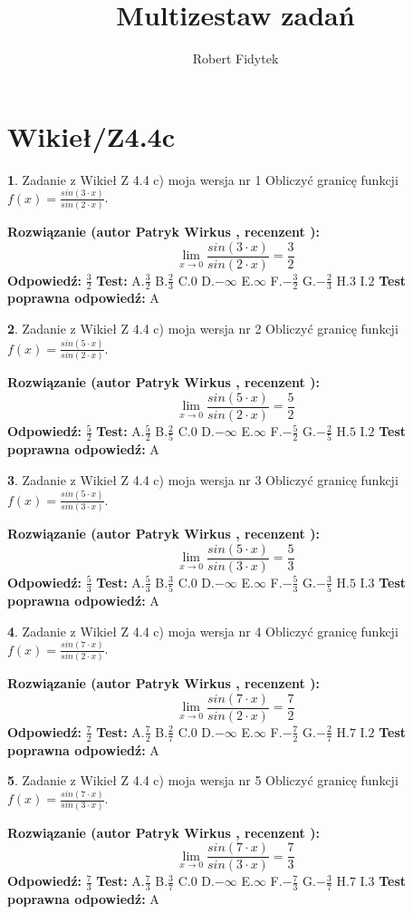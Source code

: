 \documentclass[12pt, a4paper]{article}
\title{Multizestaw zadań}
\author{Robert Fidytek}
\date{}
\theoremstyle{definition} %
\newtheorem{zad}{}
\newcommand{\kategoria}[1]{\section{#1}}
\newcommand{\zadStart}[1]{\begin{zad}#1\newline}
\newcommand{\zadStop}{\end{zad}}
\newcommand{\rozwStart}[2]{\noindent \textbf{Rozwiązanie (autor #1 , recenzent #2): }\newline}
\newcommand{\rozwStop}{\newline}
\newcommand{\odpStart}{\noindent \textbf{Odpowiedź:}\newline}
\newcommand{\odpStop}{\newline}
\newcommand{\testStart}{\noindent \textbf{Test:}\newline}
\newcommand{\testStop}{\newline}
\newcommand{\kluczStart}{\noindent \textbf{Test poprawna odpowiedź:}\newline}
\newcommand{\kluczStop}{\newline}
\begin{document}
\maketitle

\kategoria{Wikieł/Z4.4c}


\zadStart{Zadanie z Wikieł Z 4.4 c) moja wersja nr 1}
Obliczyć granicę funkcji $f(x)=\frac{sin(3\cdot x)}{sin(2\cdot x)}$.
\zadStop
\rozwStart{Patryk Wirkus}{}
$$\lim\limits_{x\to 0}\frac{sin(3\cdot x)}{sin(2\cdot x)}=
\frac{3}{2}$$
\rozwStop
\odpStart
$\frac{3}{2}$
\odpStop
\testStart
A.$\frac{3}{2}$
B.$\frac{2}{3}$
C.$0$
D.$-\infty$
E.$\infty$
F.$-\frac{3}{2}$
G.$-\frac{2}{3}$
H.$3$
I.$2$
\testStop
\kluczStart
A
\kluczStop



\zadStart{Zadanie z Wikieł Z 4.4 c) moja wersja nr 2}
Obliczyć granicę funkcji $f(x)=\frac{sin(5\cdot x)}{sin(2\cdot x)}$.
\zadStop
\rozwStart{Patryk Wirkus}{}
$$\lim\limits_{x\to 0}\frac{sin(5\cdot x)}{sin(2\cdot x)}=
\frac{5}{2}$$
\rozwStop
\odpStart
$\frac{5}{2}$
\odpStop
\testStart
A.$\frac{5}{2}$
B.$\frac{2}{5}$
C.$0$
D.$-\infty$
E.$\infty$
F.$-\frac{5}{2}$
G.$-\frac{2}{5}$
H.$5$
I.$2$
\testStop
\kluczStart
A
\kluczStop



\zadStart{Zadanie z Wikieł Z 4.4 c) moja wersja nr 3}
Obliczyć granicę funkcji $f(x)=\frac{sin(5\cdot x)}{sin(3\cdot x)}$.
\zadStop
\rozwStart{Patryk Wirkus}{}
$$\lim\limits_{x\to 0}\frac{sin(5\cdot x)}{sin(3\cdot x)}=
\frac{5}{3}$$
\rozwStop
\odpStart
$\frac{5}{3}$
\odpStop
\testStart
A.$\frac{5}{3}$
B.$\frac{3}{5}$
C.$0$
D.$-\infty$
E.$\infty$
F.$-\frac{5}{3}$
G.$-\frac{3}{5}$
H.$5$
I.$3$
\testStop
\kluczStart
A
\kluczStop



\zadStart{Zadanie z Wikieł Z 4.4 c) moja wersja nr 4}
Obliczyć granicę funkcji $f(x)=\frac{sin(7\cdot x)}{sin(2\cdot x)}$.
\zadStop
\rozwStart{Patryk Wirkus}{}
$$\lim\limits_{x\to 0}\frac{sin(7\cdot x)}{sin(2\cdot x)}=
\frac{7}{2}$$
\rozwStop
\odpStart
$\frac{7}{2}$
\odpStop
\testStart
A.$\frac{7}{2}$
B.$\frac{2}{7}$
C.$0$
D.$-\infty$
E.$\infty$
F.$-\frac{7}{2}$
G.$-\frac{2}{7}$
H.$7$
I.$2$
\testStop
\kluczStart
A
\kluczStop



\zadStart{Zadanie z Wikieł Z 4.4 c) moja wersja nr 5}
Obliczyć granicę funkcji $f(x)=\frac{sin(7\cdot x)}{sin(3\cdot x)}$.
\zadStop
\rozwStart{Patryk Wirkus}{}
$$\lim\limits_{x\to 0}\frac{sin(7\cdot x)}{sin(3\cdot x)}=
\frac{7}{3}$$
\rozwStop
\odpStart
$\frac{7}{3}$
\odpStop
\testStart
A.$\frac{7}{3}$
B.$\frac{3}{7}$
C.$0$
D.$-\infty$
E.$\infty$
F.$-\frac{7}{3}$
G.$-\frac{3}{7}$
H.$7$
I.$3$
\testStop
\kluczStart
A
\kluczStop
\end{document}
